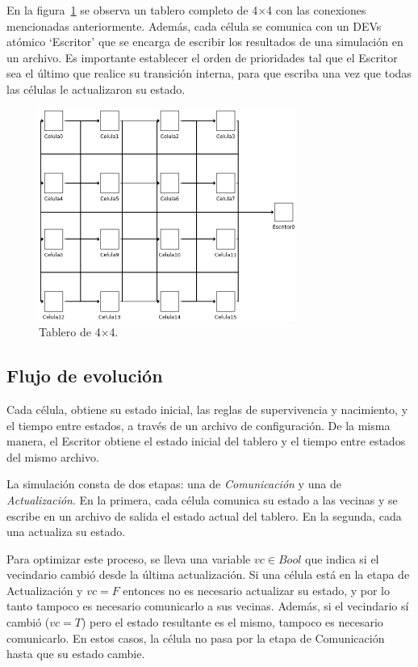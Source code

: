 \documentclass[12pt]{article}
\begin{document}
En la figura~\ref{img:tablero} se observa un tablero completo de 4$\times$4 con las conexiones mencionadas anteriormente. Además, cada célula se comunica con un DEVs atómico `Escritor' que se encarga de escribir los resultados de una simulación en un archivo. Es importante establecer el orden de prioridades tal que el Escritor sea el último que realice su transición interna, para que escriba una vez que todas las células le actualizaron su estado.

\begin{figure}[ht]
  \centering
  \includegraphics[width=0.75\textwidth]{imagenes/tablero.png}
  \caption{Tablero de 4$\times$4.}\label{img:tablero}
\end{figure}


\subsection{Flujo de evolución}

Cada célula, obtiene su estado inicial, las reglas de supervivencia y nacimiento, y el tiempo entre estados, a través de un archivo de configuración. De la misma manera, el Escritor obtiene el estado inicial del tablero y el tiempo entre estados del mismo archivo.

La simulación consta de dos etapas: una de \textit{Comunicación} y una de \textit{Actualización}. En la primera, cada célula comunica su estado a las vecinas y se escribe en un archivo de salida el estado actual del tablero. En la segunda, cada una actualiza su estado.

Para optimizar este proceso, se lleva una variable $vc \in Bool$ que indica si el vecindario cambió desde la última actualización. Si una célula está en la etapa de Actualización y $vc = F$ entonces no es necesario actualizar su estado, y por lo tanto tampoco es necesario comunicarlo a sus vecinas. Además, si el vecindario sí cambió ($vc = T$) pero el estado resultante es el mismo, tampoco es necesario comunicarlo. En estos casos, la célula no pasa por la etapa de Comunicación hasta que su estado cambie.
\end{document}
